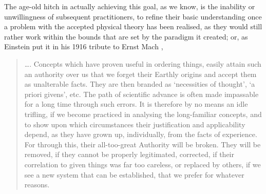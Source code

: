 The age-old hitch in actually achieving this goal, as we know, is the inability or unwillingness of subsequent practitioners, to refine their basic understanding once a problem with the accepted physical theory has been realised, as they would still rather work within the bounds that are set by the paradigm it created; or, as Einstein put it in his 1916 tribute to Ernst Mach \cite{Einstein1916},
\begin{quotation}

\ldots. Concepts which have proven useful in ordering things, easily attain such an authority over us that we forget their Earthly origins and accept them as unalterable facts. They are then branded as `necessities of thought', `a priori givens', etc. The path of scientific advance is often made impassable for a long time through such errors. It is therefore by no means an idle trifling, if we become practiced in analysing the long-familiar concepts, and to show upon which circumstances their justification and applicability depend, as they have grown up, individually, from the facts of experience. For through this, their all-too-great Authority will be broken. They will be removed, if they cannot be properly legitimated, corrected, if their correlation to given things was far too careless, or replaced by others, if we see a new system that can be established, that we prefer for whatever reasons.


\end{quotation}
